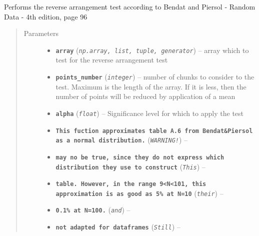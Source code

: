 \documentclass[a4paper,10pt,oneside]{sphinxmanual}
\begin{document}

\begin{fulllineitems}
\label{pymicra:pymicra.data.reverse_arrangement}
Performs the reverse arrangement test
according to Bendat and Piersol - Random Data - 4th edition, page 96
\begin{quote}\begin{description}
\item[{Parameters}] \leavevmode\begin{itemize}
\item {} 
\textbf{\texttt{array}} (\emph{\texttt{np.array, list, tuple, generator}}) -- array which to test for the reverse arrangement test

\item {} 
\textbf{\texttt{points\_number}} (\emph{\texttt{integer}}) -- number of chunks to consider to the test. Maximum is the length of the array.
If it is less, then the number of points will be reduced by application of a mean

\item {} 
\textbf{\texttt{alpha}} (\emph{\texttt{float}}) -- Significance level for which to apply the test

\item {} 
\textbf{\texttt{This fuction approximates table A.6 from Bendat\&Piersol as a normal distribution.}} (\emph{\texttt{WARNING!}}) -- 

\item {} 
\textbf{\texttt{may no be true, since they do not express which distribution they use to construct}} (\emph{\texttt{This}}) -- 

\item {} 
\textbf{\texttt{table. However, in the range 9\textless{}N\textless{}101, this approximation is as good as 5\% at N=10}} (\emph{\texttt{their}}) -- 

\item {} 
\textbf{\texttt{0.1\% at N=100.}} (\emph{\texttt{and}}) -- 

\item {} 
\textbf{\texttt{not adapted for dataframes}} (\emph{\texttt{Still}}) -- 

\end{itemize}

\end{description}\end{quote}

\end{fulllineitems}
\end{document}
